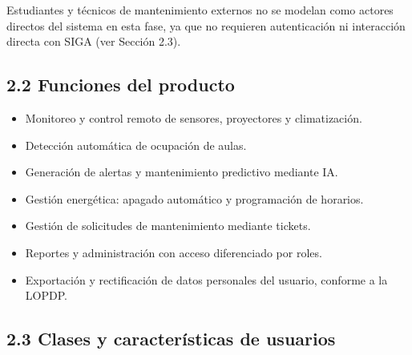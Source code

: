 Estudiantes y técnicos de mantenimiento externos no se modelan como actores directos del sistema en esta fase, ya que no requieren autenticación ni interacción directa con SIGA (ver Sección 2.3).


\subsection*{2.2 Funciones del producto}


\begin{itemize}\item Monitoreo y control remoto de sensores, proyectores y climatización.\end{itemize}

\begin{itemize}\item Detección automática de ocupación de aulas.\end{itemize}

\begin{itemize}\item Generación de alertas y mantenimiento predictivo mediante IA.\end{itemize}

\begin{itemize}\item Gestión energética: apagado automático y programación de horarios.\end{itemize}

\begin{itemize}\item Gestión de solicitudes de mantenimiento mediante tickets.\end{itemize}

\begin{itemize}\item Reportes y administración con acceso diferenciado por roles.\end{itemize}

\begin{itemize}\item Exportación y rectificación de datos personales del usuario, conforme a la LOPDP.\end{itemize}

\subsection*{2.3 Clases y características de usuarios}

